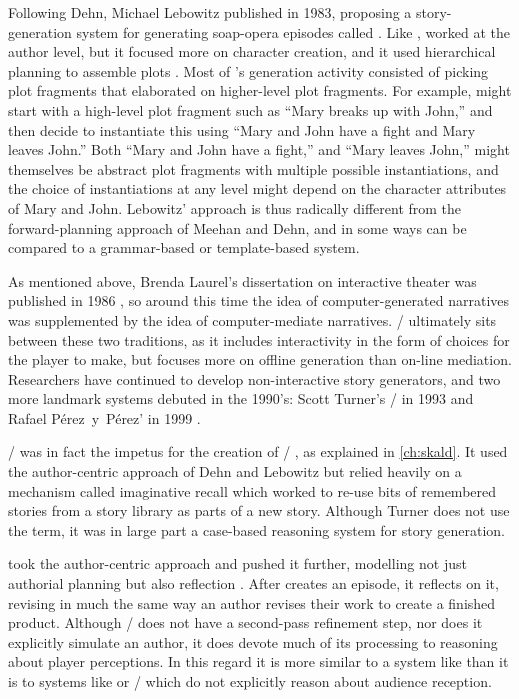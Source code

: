 Following Dehn, Michael Lebowitz published  in 1983, proposing a story-generation system for generating soap-opera episodes called  \citep{Lebowitz1983}.
%
Like ,  worked at the author level, but it focused more on character creation, and it used hierarchical planning to assemble plots \citep{Lebowitz1984,Lebowitz1985}.
%
Most of 's generation activity consisted of picking plot fragments that elaborated on higher-level plot fragments.
%
For example,  might start with a high-level plot fragment such as ``Mary breaks up with John,'' and then decide to instantiate this using ``Mary and John have a fight and Mary leaves John.''
%
Both ``Mary and John have a fight,'' and ``Mary leaves John,'' might themselves be abstract plot fragments with multiple possible instantiations, and the choice of instantiations at any level might depend on the character attributes of Mary and John.
%
Lebowitz'  approach is thus radically different from the forward-planning approach of Meehan and Dehn, and in some ways can be compared to a grammar-based or template-based system.


As mentioned above, Brenda Laurel's dissertation on interactive theater was published in 1986 \citep{Laurel1986}, so around this time the idea of computer-generated narratives was supplemented by the idea of computer-mediate narratives.
%
\dunyazad/ ultimately sits between these two traditions, as it includes interactivity in the form of choices for the player to make, but focuses more on offline generation than on-line mediation.
%
Researchers have continued to develop non-interactive story generators, and two more landmark systems debuted in the 1990's: Scott Turner's \minstrel/ in 1993 and Rafael P\'{e}rez~y~P\'{e}rez'  in 1999 \citep{Turner1993,PerezyPerez1999}.


\minstrel/ was in fact the impetus for the creation of \dunyazad/ , as explained in \cref{ch:skald}.
%
It used the author-centric approach of Dehn and Lebowitz but relied heavily on a mechanism called imaginative recall which worked to re-use bits of remembered stories from a story library as parts of a new story.
%
Although Turner does not use the term, it was in large part a case-based reasoning system for story generation.


 took the author-centric approach and pushed it further, modelling not just authorial planning but also reflection \citep{PerezyPerez2001}.
%
After  creates an episode, it reflects on it, revising in much the same way an author revises their work to create a finished product.
%
Although \dunyazad/ does not have a second-pass refinement step, nor does it explicitly simulate an author, it does devote much of its processing to reasoning about player perceptions.
%
In this regard it is more similar to a system like  than it is to systems like  or \minstrel/ which do not explicitly reason about audience reception.



